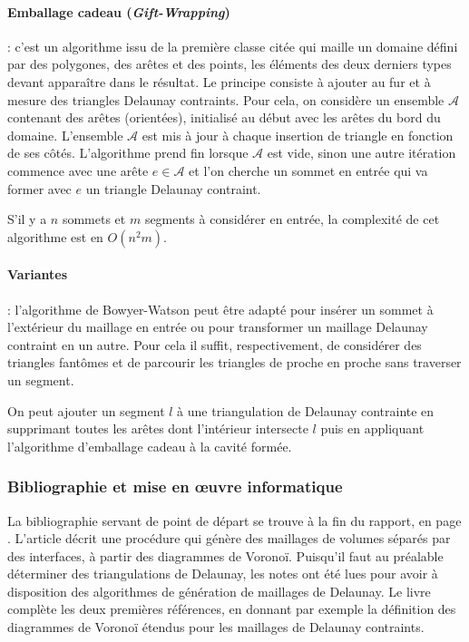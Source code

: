 \documentclass[12pt,a4paper]{report}
\begin{document}
\paragraph{\indent Emballage cadeau (\emph{Gift-Wrapping})} : c'est un algorithme issu de la première classe citée qui maille un domaine défini par des polygones, des arêtes et des points, les éléments des deux derniers types devant apparaître dans le résultat. Le principe consiste à ajouter au fur et à mesure des triangles Delaunay contraints. Pour cela, on considère un ensemble $\mathcal{A}$ contenant des arêtes (orientées), initialisé au début avec les arêtes du bord du domaine. L'ensemble $\mathcal{A}$ est mis à jour à chaque insertion de triangle en fonction de ses côtés. L'algorithme prend fin lorsque $\mathcal{A}$ est vide, sinon une autre itération commence avec une arête $e\in\mathcal{A}$ et l'on cherche un sommet en entrée qui va former avec $e$ un triangle Delaunay contraint.

S'il y a $n$ sommets et $m$ segments à considérer en entrée, la complexité de cet algorithme est en $O(n^{2}m)$.

\paragraph{Variantes} : l'algorithme de Bowyer-Watson peut être adapté pour insérer un sommet à l'extérieur du maillage en entrée ou pour transformer un maillage Delaunay contraint en un autre. Pour cela il suffit, respectivement, de considérer des triangles \og fantômes \fg{} et de parcourir les triangles de proche en proche sans traverser un segment.

On peut ajouter un segment $l$ à une triangulation de Delaunay contrainte en supprimant toutes les arêtes dont l'intérieur intersecte $l$ puis en appliquant l'algorithme d'emballage cadeau à la cavité formée.

\vspace{1cm}
\subsubsection{Bibliographie et mise en \oe{}uvre informatique}

La bibliographie servant de point de départ se trouve à la fin du rapport, en page \pageref{biblio}. L'article \cite{Garimella} décrit une procédure qui génère des maillages de volumes séparés par des interfaces, à partir des diagrammes de Voronoï. Puisqu'il faut au préalable déterminer des triangulations de Delaunay, les notes \cite{delnotes} ont été lues pour avoir à disposition des algorithmes de génération de maillages de Delaunay. Le livre \cite{Edelsbrunner} complète les deux premières références, en donnant par exemple la définition des diagrammes de Voronoï étendus pour les maillages de Delaunay contraints.
\end{document}
